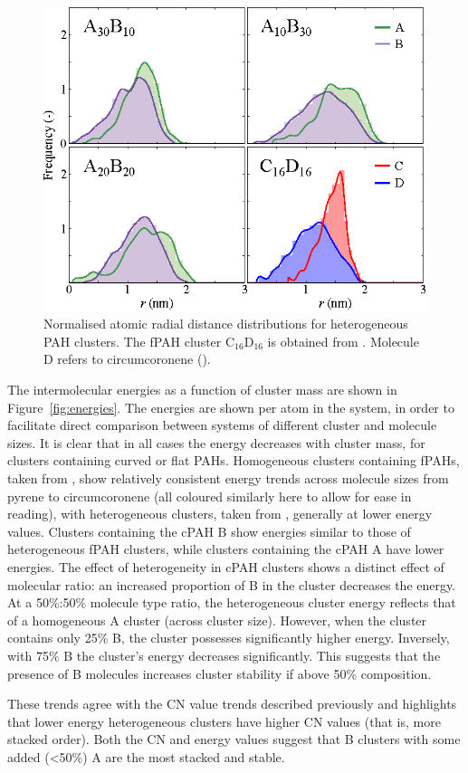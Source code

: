 %
\begin{figure}[!tbh]
\centering
\includegraphics[width=0.6\linewidth]{Figures/radii_histograms_aa.eps}
\caption{Normalised atomic radial distance distributions for heterogeneous PAH clusters. The fPAH cluster $\text{C}_{\text{16}}\text{D}_{\text{16}}$ is obtained from \citet{bowal2018partitioning}. Molecule D refers to circumcoronene ().}
\label{fig:radialdists_atomic}
\end{figure}
%

The intermolecular energies as a function of cluster mass are shown in Figure~\ref{fig:energies}.  The energies are shown per atom in the system, in order to facilitate direct comparison between systems of different cluster and molecule sizes. It is clear that in all cases the energy decreases with cluster mass, for clusters containing curved or flat PAHs. Homogeneous clusters containing fPAHs, taken from \citet{chen2014size,chen2015solid}, show relatively consistent energy trends across molecule sizes from pyrene to circumcoronene (all coloured similarly here to allow for ease in reading), with heterogeneous clusters, taken from \citet{bowal2018partitioning}, generally at lower energy values. Clusters containing the cPAH B show energies similar to those of heterogeneous fPAH clusters, while clusters containing the cPAH A have lower energies.
The effect of heterogeneity in cPAH clusters shows a distinct effect of molecular ratio: an increased proportion of B in the cluster decreases the energy. At a 50\%:50\% molecule type ratio, the heterogeneous cluster energy reflects that of a homogeneous A cluster (across cluster size). However, when the cluster contains only 25\% B, the cluster possesses significantly higher energy. Inversely, with 75\% B the cluster's energy decreases significantly.  This suggests that the presence of B molecules increases cluster stability if above 50\% composition.

These trends agree with the CN value trends described previously and highlights that lower energy heterogeneous clusters have higher CN values (that is, more stacked order). %
Both the CN and energy values suggest that B clusters with some added (<50\%) A are the most stacked and stable.

